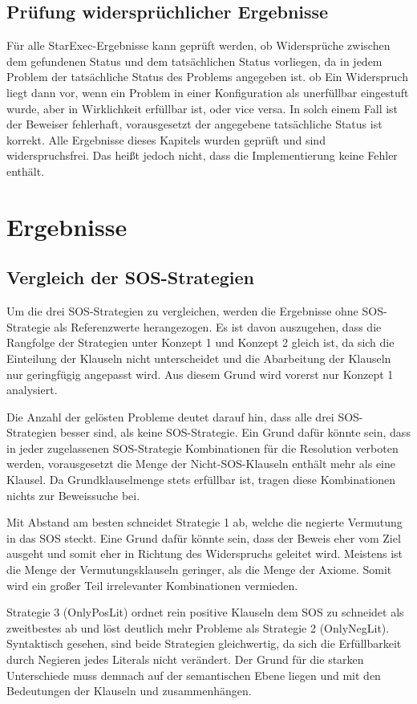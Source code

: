 	\subsection{Prüfung widersprüchlicher Ergebnisse}
		Für alle StarExec-Ergebnisse kann geprüft werden, ob Widersprüche zwischen dem gefundenen Status und dem tatsächlichen Status vorliegen, da in jedem Problem der tatsächliche Status des Problems angegeben ist. ob  Ein Widerspruch liegt dann vor, wenn ein Problem in einer Konfiguration als unerfüllbar eingestuft wurde, aber in Wirklichkeit erfüllbar ist, oder vice versa. In solch einem Fall ist der Beweiser fehlerhaft, vorausgesetzt der angegebene tatsächliche Status ist korrekt. Alle Ergebnisse dieses Kapitels wurden geprüft und sind widerspruchsfrei. Das heißt jedoch nicht, dass die Implementierung keine Fehler enthält.

\section{Ergebnisse}
	\subsection{Vergleich der SOS-Strategien}
	 	Um die drei SOS-Strategien zu vergleichen, werden die Ergebnisse ohne SOS-Strategie als Referenzwerte herangezogen.
	 	Es ist davon auszugehen, dass die Rangfolge der Strategien unter Konzept 1 und Konzept 2 gleich ist, da sich die Einteilung der Klauseln nicht unterscheidet und die Abarbeitung der Klauseln nur geringfügig angepasst wird. Aus diesem Grund wird vorerst nur Konzept 1 analysiert.
	 	
	 	Die Anzahl der gelösten Probleme deutet darauf hin, dass alle drei SOS-Strategien besser sind, als keine SOS-Strategie. 
	 	Ein Grund dafür könnte sein, dass in jeder zugelassenen SOS-Strategie Kombinationen für die Resolution verboten werden, vorausgesetzt die Menge der Nicht-SOS-Klauseln enthält mehr als eine Klausel. Da Grundklauselmenge stets erfüllbar ist, tragen diese Kombinationen nichts zur Beweissuche bei.
	 	
	 	Mit Abstand am besten schneidet Strategie 1 ab, welche die negierte Vermutung in das SOS steckt. Eine Grund dafür könnte sein, dass der Beweis eher vom Ziel ausgeht und somit eher in Richtung des Widerspruchs geleitet wird. Meistens ist die Menge der Vermutungsklauseln geringer, als die Menge der Axiome. Somit wird ein großer Teil irrelevanter Kombinationen vermieden.
		
		Strategie 3 (OnlyPosLit) ordnet rein positive Klauseln dem SOS zu schneidet als zweitbestes ab und löst deutlich mehr Probleme als Strategie 2 (OnlyNegLit). Syntaktisch gesehen, sind beide Strategien gleichwertig, da sich die Erfüllbarkeit durch Negieren jedes Literals nicht verändert. Der Grund für die starken Unterschiede muss demnach auf der semantischen Ebene liegen und mit den Bedeutungen der Klauseln und zusammenhängen. 
		
